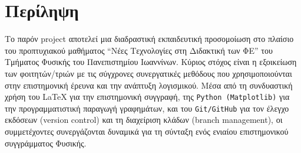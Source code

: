 \chapter*{Περίληψη}

Το παρόν project αποτελεί μια διαδραστική εκπαιδευτική προσομοίωση στο πλαίσιο του προπτυχιακού
μαθήματος ``Νέες Τεχνολογίες στη Διδακτική των ΦΕ'' του Τμήματος Φυσικής του Πανεπιστημίου
Ιωαννίνων. Κύριος στόχος είναι η εξοικείωση των φοιτητών/τριών με τις σύγχρονες συνεργατικές
μεθόδους που χρησιμοποιούνται στην επιστημονική έρευνα και την ανάπτυξη λογισμικού. Μέσα από τη
συνδυαστική χρήση του \LaTeX{} για την επιστημονική συγγραφή, της \texttt{Python (Matplotlib)} για
την προγραμματιστική παραγωγή γραφημάτων, και του \texttt{Git/GitHub} για τον έλεγχο εκδόσεων
(version control) και τη διαχείριση κλάδων (branch management), οι συμμετέχοντες συνεργάζονται
δυναμικά για τη σύνταξη ενός ενιαίου επιστημονικού συγγράμματος Φυσικής.
